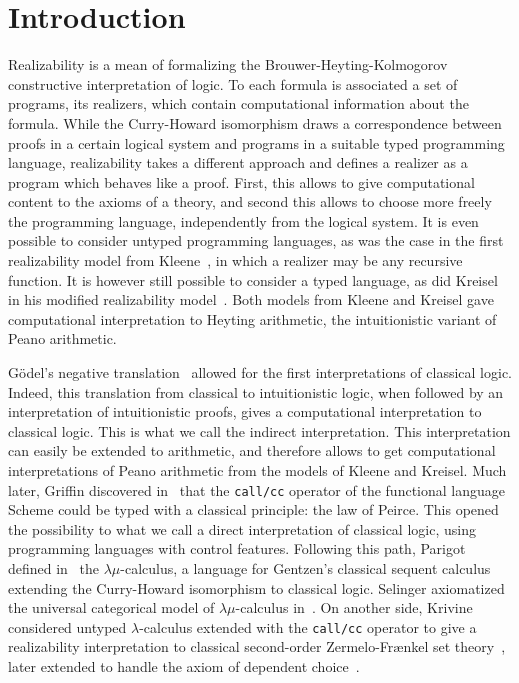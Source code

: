 \documentclass{CSML}
\begin{document}
\section*{Introduction}
Realizability is a mean of formalizing the Brouwer-Heyting-Kolmogorov constructive interpretation of logic. To each formula is associated a set of programs, its realizers, which contain computational information about the formula. While the Curry-Howard isomorphism draws a correspondence between proofs in a certain logical system and programs in a suitable typed programming language, realizability takes a different approach and defines a realizer as a program which behaves like a proof. First, this allows to give computational content to the axioms of a theory, and second this allows to choose more freely the programming language, independently from the logical system. It is even possible to consider untyped programming languages, as was the case in the first realizability model from Kleene~\cite{Kleene}, in which a realizer may be any recursive function. It is however still possible to consider a typed language, as did Kreisel in his modified realizability model~\cite{Kreisel}. Both models from Kleene and Kreisel gave computational interpretation to Heyting arithmetic, the intuitionistic variant of Peano arithmetic.\par
G\"odel's negative translation~\cite{GodelNegative} allowed for the first interpretations of classical logic. Indeed, this translation from classical to intuitionistic logic, when followed by an interpretation of intuitionistic proofs, gives a computational interpretation to classical logic. This is what we call the indirect interpretation. This interpretation can easily be extended to arithmetic, and therefore allows to get computational interpretations of Peano arithmetic from the models of Kleene and Kreisel. Much later, Griffin discovered in~\cite{GriffinControl} that the \texttt{call/cc} operator of the functional language Scheme could be typed with a classical principle: the law of Peirce. This opened the possibility to what we call a direct interpretation of classical logic, using programming languages with control features. Following this path, Parigot defined in~\cite{ParigotLambdaMu} the $\lambda\mu$-calculus, a language for Gentzen's classical sequent calculus extending the Curry-Howard isomorphism to classical logic. Selinger axiomatized the universal categorical model of $\lambda\mu$-calculus in~\cite{SelingerControl}. On another side, Krivine considered untyped $\lambda$-calculus extended with the \texttt{call/cc} operator to give a realizability interpretation to classical second-order Zermelo-Fr\ae nkel set theory~\cite{KrivineZF}, later extended to handle the axiom of dependent choice~\cite{KrivineDependent,KrivinePanoramas}.\par
\end{document}
